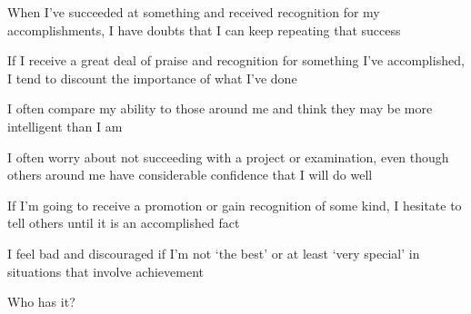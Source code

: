 \documentclass[aspectratio=169]{beamer}
\begin{document}
\begin{frame}
  \begin{center}
    \Huge   When  I’ve  succeeded  at  something  and  received  recognition  for  my  accomplishments,  I  have  doubts  that I can keep repeating that success
  \end{center}
\end{frame}

\begin{frame}
  \begin{center}
    \Huge     If  I  receive  a  great  deal  of  praise  and  recognition  for  something  I’ve  accomplished,  I  tend  to  discount  the  importance
    of  what  I’ve  done
  \end{center}
\end{frame}

\begin{frame}
  \begin{center}
    \Huge     I often compare my ability to those around me and think they may be more intelligent than I am
  \end{center}
\end{frame}

\begin{frame}
  \begin{center}
    \Huge      I often worry about not succeeding with a project or examination, even though others around me have considerable
    confidence that I will do well
  \end{center}
\end{frame}

\begin{frame}
  \begin{center}
    \Huge       If  I’m  going  to  receive  a  promotion  or  gain  recognition  of  some  kind,  I  hesitate  to  tell  others  until  it  is  an
    accomplished fact
  \end{center}
\end{frame}

\begin{frame}
  \begin{center}
    \Huge  I  feel  bad  and  discouraged  if  I’m  not  `the  best'  or  at  least  `very  special'  in  situations  that  involve  achievement
  \end{center}
\end{frame}

\begin{frame}
  \begin{center}
    \Huge Who has it?
    \\ \small \cite{clanceimes78}
    \\ \small \cite{attr98}
    \\ \small \cite{colour}
  \end{center}
\end{frame}
\end{document}
